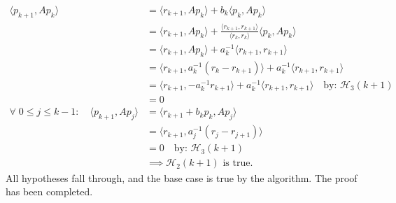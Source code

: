 \documentclass[]{article}
\begin{document}
    \begin{align*}\tag{1.6}\label{eqn:1.6}
        \langle p_{k + 1}, Ap_k\rangle &= 
        \langle r_{k + 1}, Ap_k\rangle + b_k\langle  p_k, Ap_k\rangle
        \\
        &= \langle r_{k + 1}, Ap_k\rangle + 
        \frac{\langle r_{k + 1}, r_{k + 1}\rangle}{\langle r_k, r_k\rangle}\langle p_k, Ap_k\rangle
        \\
        &= \langle r_{k + 1}, Ap_k\rangle + 
        a_k^{-1}\langle r_{k + 1}, r_{k + 1}\rangle
        \\
        &= \langle r_{k + 1}, a_{k}^{-1}(r_k - r_{k + 1})\rangle + 
        a_k^{-1}\langle r_{k + 1}, r_{k + 1}\rangle
        \\
        &= \langle r_{k + 1}, - a_{k}^{-1}r_{k + 1}\rangle + 
        a_k^{-1}\langle r_{k + 1}, r_{k + 1}\rangle \quad \text{by: }\mathcal{H}_3(k + 1)
        \\
        &= 0
        \\
        \forall\; 0 \le j \le k - 1: \quad 
        \langle p_{k + 1}, Ap_j\rangle &= \langle r_{k + 1} + b_kp_k, Ap_j\rangle
        \\
        &= \langle r_{k + 1}, a_j^{-1}(r_j - r_{j + 1})\rangle
        \\
        &= 0 \quad \text{by: } \mathcal{H}_3(k + 1)
        \\
        & \implies \mathcal{H}_2(k + 1)\text{ is true}.
    \end{align*}
    All hypotheses fall through, and the base case is true by the algorithm. The proof has been completed. 
    
\end{document}
